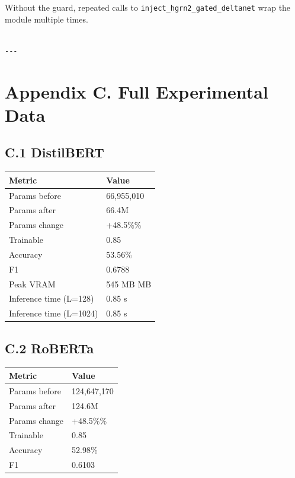 Without the guard, repeated calls to \texttt{inject\_hgrn2\_gated\_deltanet} wrap the 
module multiple times.
\begin{lstlisting}

---
\end{lstlisting}

\section{Appendix C. Full Experimental Data}

\subsection{C.1 DistilBERT}

\begin{table}[H]
\centering
\small
\begin{tabular}{ll}
\toprule
\textbf{Metric} & \textbf{Value} \\
\midrule
Params before & 66,955,010 \\
Params after & 66.4M \\
Params change & +48.5\%\% \\
Trainable & 0.85 \\
Accuracy & 53.56\% \\
F1 & 0.6788 \\
Peak VRAM & 545 MB MB \\
Inference time (L=128) & 0.85 s \\
Inference time (L=1024) & 0.85 s \\
\bottomrule
\end{tabular}
\end{table}

\subsection{C.2 RoBERTa}

\begin{table}[H]
\centering
\small
\begin{tabular}{ll}
\toprule
\textbf{Metric} & \textbf{Value} \\
\midrule
Params before & 124,647,170 \\
Params after & 124.6M \\
Params change & +48.5\%\% \\
Trainable & 0.85 \\
Accuracy & 52.98\% \\
F1 & 0.6103 \\
\bottomrule
\end{tabular}
\end{table}

